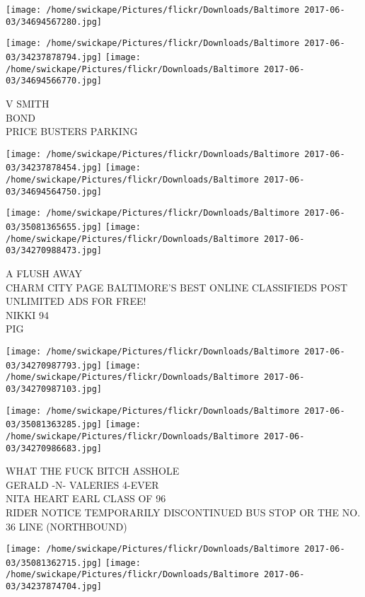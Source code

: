 \documentclass[10pt,letterpaper]{article}
\begin{document}
\texttt{[image: /home/swickape/Pictures/flickr/Downloads/Baltimore 2017-06-03/34694567280.jpg]}

\vspace{0.25in}
\texttt{[image: /home/swickape/Pictures/flickr/Downloads/Baltimore 2017-06-03/34237878794.jpg]}
\texttt{[image: /home/swickape/Pictures/flickr/Downloads/Baltimore 2017-06-03/34694566770.jpg]}

V SMITH\\
BOND\\
PRICE BUSTERS PARKING
\pagebreak

\texttt{[image: /home/swickape/Pictures/flickr/Downloads/Baltimore 2017-06-03/34237878454.jpg]}
\texttt{[image: /home/swickape/Pictures/flickr/Downloads/Baltimore 2017-06-03/34694564750.jpg]}

\texttt{[image: /home/swickape/Pictures/flickr/Downloads/Baltimore 2017-06-03/35081365655.jpg]}
\texttt{[image: /home/swickape/Pictures/flickr/Downloads/Baltimore 2017-06-03/34270988473.jpg]}

A FLUSH AWAY\\
CHARM CITY PAGE BALTIMORE'S BEST ONLINE CLASSIFIEDS POST UNLIMITED ADS FOR FREE!\\
NIKKI 94\\
PIG
\pagebreak

\texttt{[image: /home/swickape/Pictures/flickr/Downloads/Baltimore 2017-06-03/34270987793.jpg]}
\texttt{[image: /home/swickape/Pictures/flickr/Downloads/Baltimore 2017-06-03/34270987103.jpg]}

\texttt{[image: /home/swickape/Pictures/flickr/Downloads/Baltimore 2017-06-03/35081363285.jpg]}
\texttt{[image: /home/swickape/Pictures/flickr/Downloads/Baltimore 2017-06-03/34270986683.jpg]}

WHAT THE FUCK BITCH ASSHOLE\\
GERALD {-}N{-} VALERIES 4{-}EVER\\
NITA HEART EARL CLASS OF 96\\
RIDER NOTICE TEMPORARILY DISCONTINUED BUS STOP OR THE NO. 36 LINE (NORTHBOUND)
\pagebreak

\texttt{[image: /home/swickape/Pictures/flickr/Downloads/Baltimore 2017-06-03/35081362715.jpg]}
\texttt{[image: /home/swickape/Pictures/flickr/Downloads/Baltimore 2017-06-03/34237874704.jpg]}
\end{document}
